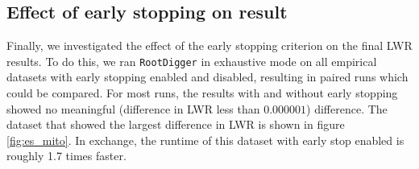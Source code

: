 \documentclass{article}
\newcommand{\RootDiggertt}{\texttt{RootDigger}}
\begin{document}
%
%


\subsection{Effect of early stopping on result}

Finally, we investigated the effect of the early stopping criterion on the final
LWR results. To do this, we ran \RootDiggertt{} in exhaustive mode on all
empirical datasets with early stopping enabled and disabled, resulting in paired
runs which could be compared. For most runs, the results with and without early
stopping showed no meaningful (difference in LWR less than $0.000001$)
difference. The dataset that showed the largest difference in LWR is shown in
figure \ref{fig:es_mito}. In exchange, the runtime of this dataset with early
stop enabled is roughly 1.7 times faster.
\end{document}
